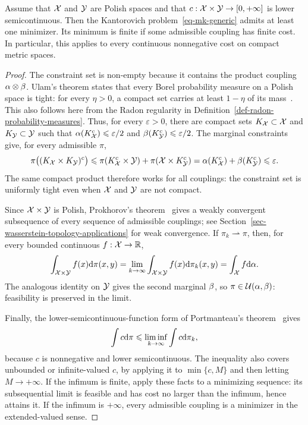 \begin{prop}\label{prop-kantorovich-existence-compact}
		Assume that $\mathcal{X}$ and $\mathcal{Y}$ are Polish spaces and that $c:\mathcal{X}\times\mathcal{Y}\to[0,+\infty]$ is lower semicontinuous. Then the Kantorovich problem~\eqref{eq-mk-generic} admits at least one minimizer. Its minimum is finite if some admissible coupling has finite cost. In particular, this applies to every continuous nonnegative cost on compact metric spaces.
\end{prop}
\begin{proof}
		The constraint set is non-empty because it contains the product coupling $\alpha\otimes\beta$. Ulam's theorem states that every Borel probability measure on a Polish space is tight: for every $\eta>0$, a compact set carries at least $1-\eta$ of its mass~\cite[Vol.~II, Section~7.1]{bogachev2007measure}. This also follows here from the Radon regularity in Definition~\ref{def-radon-probability-measures}. Thus, for every $\varepsilon>0$, there are compact sets $K_{\mathcal{X}}\subset\mathcal{X}$ and $K_{\mathcal{Y}}\subset\mathcal{Y}$ such that $\alpha(K_{\mathcal{X}}^c)\leqslant\varepsilon/2$ and $\beta(K_{\mathcal{Y}}^c)\leqslant\varepsilon/2$. The marginal constraints give, for every admissible $\pi$,
		\[
			\pi\bigl((K_{\mathcal{X}}\times K_{\mathcal{Y}})^c\bigr)
			\leqslant\pi(K_{\mathcal{X}}^c\times\mathcal{Y})+\pi(\mathcal{X}\times K_{\mathcal{Y}}^c)
			=\alpha(K_{\mathcal{X}}^c)+\beta(K_{\mathcal{Y}}^c)\leqslant\varepsilon.
		\]
		The same compact product therefore works for all couplings: the constraint set is uniformly tight even when $\mathcal{X}$ and $\mathcal{Y}$ are not compact.

		Since $\mathcal{X}\times\mathcal{Y}$ is Polish, Prokhorov's theorem~\cite{bogachev2007measure,Villani09} gives a weakly convergent subsequence of every sequence of admissible couplings; see Section~\ref{sec-wasserstein-topology-applications} for weak convergence. If $\pi_k\rightharpoonup\pi$, then, for every bounded continuous $f:\mathcal{X}\to\mathbb{R}$,
		\[
			\int_{\mathcal{X}\times\mathcal{Y}} f(x)\mathrm{d}\pi(x,y)
			=\lim_{k\to\infty}\int_{\mathcal{X}\times\mathcal{Y}} f(x)\mathrm{d}\pi_k(x,y)
			=\int_{\mathcal{X}} f\mathrm{d}\alpha.
		\]
		The analogous identity on $\mathcal{Y}$ gives the second marginal $\beta$, so $\pi\in\mathcal{U}(\alpha,\beta)$: feasibility is preserved in the limit.

		Finally, the lower-semicontinuous-function form of Portmanteau's theorem~\cite[Vol.~II, Theorem~8.2.3 and Corollary~8.2.5]{bogachev2007measure} gives
		\[
			\int c\mathrm{d}\pi\leqslant\liminf_{k\to\infty}\int c\mathrm{d}\pi_k,
		\]
		because $c$ is nonnegative and lower semicontinuous. The inequality also covers unbounded or infinite-valued $c$, by applying it to $\min\{c,M\}$ and then letting $M\to+\infty$. If the infimum is finite, apply these facts to a minimizing sequence: its subsequential limit is feasible and has cost no larger than the infimum, hence attains it. If the infimum is $+\infty$, every admissible coupling is a minimizer in the extended-valued sense.
\end{proof}

